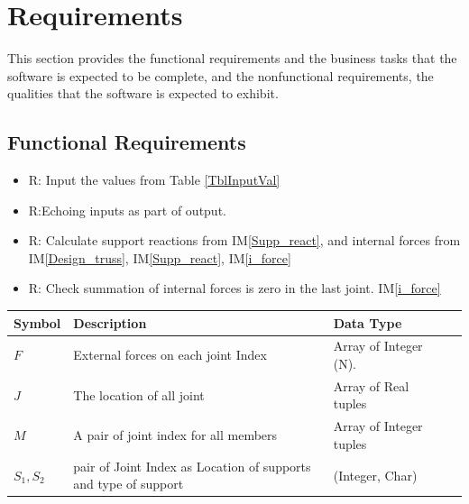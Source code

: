 \documentclass[12pt]{article}
\newcommand{\iref}[1]{IM\ref{#1}}
\newcounter{reqnum} %
\begin{document}
\section{Requirements}

This section provides the functional requirements and the business tasks that the
software is expected to be complete, and the nonfunctional requirements, the
qualities that the software is expected to exhibit.

\subsection{Functional Requirements}

\noindent \begin{itemize}

\item{R\thereqnum \label{R_Inputs}: Input the values from Table \ref{TblInputVal}}

\item{R\thereqnum \label{R_OutputInputs}:Echoing inputs as part of output.} 

\item{R\thereqnum \label{R_Calculate}: Calculate support reactions from \iref{Supp_react}, and internal forces from \iref{Design_truss}, \iref{Supp_react}, \iref{i_force}}

\item{R\thereqnum \label{R_VerifyOutput}: Check summation of internal forces is zero in the last joint. \iref{i_force}}
 \end{itemize}
\begin{table}[!h]
	\caption{Required Inputs} \label{TblInputVal}
	\renewcommand{\arraystretch}{1.2}
	\noindent \begin{longtable*}{l l l l c} 
		\toprule
		\textbf{Symbol} & \textbf{Description} & \textbf{Data Type} \\
		\midrule 
		$F$  & External forces on each joint Index  & Array of Integer (\si{\newton}). \\
		$J$  & The location of all joint & Array of Real tuples \\
		$M$  & A pair of joint index for all members &Array of Integer tuples \\
		
		$S_1, S_2$ & pair of Joint Index as Location of supports and type of support   &(Integer, Char) \\
		\bottomrule
		
	\end{longtable*}
\end{table}
\end{document}
